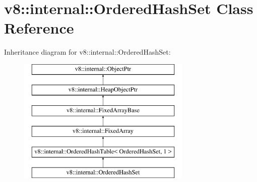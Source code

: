 \hypertarget{classv8_1_1internal_1_1OrderedHashSet}{}\section{v8\+:\+:internal\+:\+:Ordered\+Hash\+Set Class Reference}
\label{classv8_1_1internal_1_1OrderedHashSet}
Inheritance diagram for v8\+:\+:internal\+:\+:Ordered\+Hash\+Set\+:\begin{figure}[H]
\begin{center}
\leavevmode
\includegraphics[height=6.000000cm]{classv8_1_1internal_1_1OrderedHashSet}
\end{center}
\end{figure}
